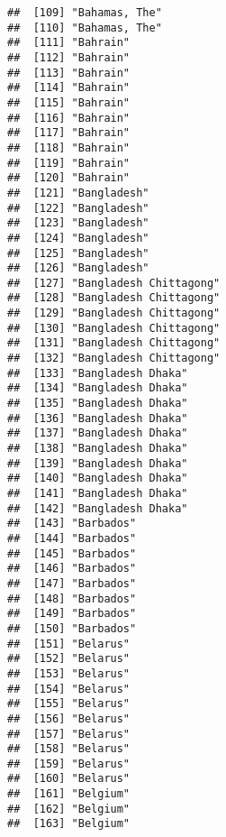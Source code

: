 \documentclass[]{article}
\begin{document}
\begin{verbatim}
##  [109] "Bahamas, The"                       
##  [110] "Bahamas, The"                       
##  [111] "Bahrain"                            
##  [112] "Bahrain"                            
##  [113] "Bahrain"                            
##  [114] "Bahrain"                            
##  [115] "Bahrain"                            
##  [116] "Bahrain"                            
##  [117] "Bahrain"                            
##  [118] "Bahrain"                            
##  [119] "Bahrain"                            
##  [120] "Bahrain"                            
##  [121] "Bangladesh"                         
##  [122] "Bangladesh"                         
##  [123] "Bangladesh"                         
##  [124] "Bangladesh"                         
##  [125] "Bangladesh"                         
##  [126] "Bangladesh"                         
##  [127] "Bangladesh Chittagong"              
##  [128] "Bangladesh Chittagong"              
##  [129] "Bangladesh Chittagong"              
##  [130] "Bangladesh Chittagong"              
##  [131] "Bangladesh Chittagong"              
##  [132] "Bangladesh Chittagong"              
##  [133] "Bangladesh Dhaka"                   
##  [134] "Bangladesh Dhaka"                   
##  [135] "Bangladesh Dhaka"                   
##  [136] "Bangladesh Dhaka"                   
##  [137] "Bangladesh Dhaka"                   
##  [138] "Bangladesh Dhaka"                   
##  [139] "Bangladesh Dhaka"                   
##  [140] "Bangladesh Dhaka"                   
##  [141] "Bangladesh Dhaka"                   
##  [142] "Bangladesh Dhaka"                   
##  [143] "Barbados"                           
##  [144] "Barbados"                           
##  [145] "Barbados"                           
##  [146] "Barbados"                           
##  [147] "Barbados"                           
##  [148] "Barbados"                           
##  [149] "Barbados"                           
##  [150] "Barbados"                           
##  [151] "Belarus"                            
##  [152] "Belarus"                            
##  [153] "Belarus"                            
##  [154] "Belarus"                            
##  [155] "Belarus"                            
##  [156] "Belarus"                            
##  [157] "Belarus"                            
##  [158] "Belarus"                            
##  [159] "Belarus"                            
##  [160] "Belarus"                            
##  [161] "Belgium"                            
##  [162] "Belgium"                            
##  [163] "Belgium"                            

\end{verbatim}
\end{document}
